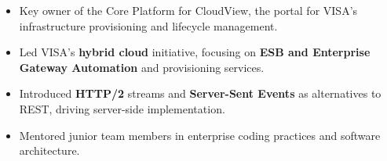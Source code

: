 \begin{itemize}
    \item Key owner of the Core Platform for CloudView, the portal for VISA’s infrastructure provisioning and lifecycle management.
    \item Led VISA’s \textbf{hybrid cloud} initiative, focusing on \textbf{ESB and Enterprise Gateway Automation} and provisioning services.
    \item Introduced \textbf{HTTP/2} streams and \textbf{Server-Sent Events} as alternatives to REST, driving server-side implementation.
    \item Mentored junior team members in enterprise coding practices and software architecture.
\end{itemize}